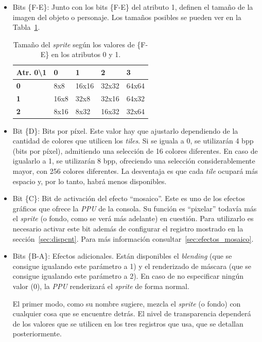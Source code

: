 \begin{itemize}
	\item Bits \{F-E\}: Junto con los bits \{F-E\} del atributo 1, definen el tamaño de la imagen del objeto o personaje. Los tamaños posibles se pueden ver en la Tabla~\ref{tab:size}.

		\begin{table}[h]
			\centering
			\begin{tabular}{| l | l | l | l | l |}
				\hline
				\textbf{Atr. 0{\textbackslash}1} & \textbf{0} & \textbf{1} & \textbf{2} & \textbf{3}  \\ \hline
				\textbf{0} & 8x8 & 16x16 & 32x32 & 64x64  \\ \hline
				\textbf{1} & 16x8 & 32x8 & 32x16 & 64x32  \\ \hline
				\textbf{2} & 8x16 & 8x32 & 16x32 & 32x64  \\ \hline
			\end{tabular}
			\caption{Tamaño del \textit{sprite} según los valores de \{F-E\} en los atributos 0 y 1.}
			\label{tab:size}
		\end{table}
		\FloatBarrier

	\item Bit \{D\}: Bits por píxel. Este valor hay que ajustarlo dependiendo de la cantidad de colores que utilicen los \textit{tiles}. Si se iguala a 0, se utilizarán 4 bpp (bits por píxel), admitiendo una selección de 16 colores diferentes. En caso de igualarlo a 1, se utilizarán 8 bpp, ofreciendo una selección considerablemente mayor, con 256 colores diferentes. La desventaja es que cada \textit{tile} ocupará más espacio y, por lo tanto, habrá menos disponibles.
	\item Bit \{C\}: Bit de activación del efecto ``mosaico''. Este es uno de los efectos gráficos que ofrece la \textit{PPU} de la consola. Su función es ``pixelar'' todavía más el \textit{sprite} (o fondo, como se verá más adelante) en cuestión. Para utilizarlo es necesario activar este bit además de configurar el registro mostrado en la sección~\ref{sec:dispcnt}. Para más información consultar~\ref{sec:efectos_mosaico}.
	\item Bits \{B-A\}: Efectos adicionales. Están disponibles el \textit{blending} (que se consigue igualando este parámetro a 1) y el renderizado de máscara (que se consigue igualando este parámetro a 2). En caso de no especificar ningún valor (0), la \textit{PPU} renderizará el \textit{sprite} de forma normal.

		El primer modo, como su nombre sugiere, mezcla el \textit{sprite} (o fondo) con cualquier cosa que se encuentre detrás. El nivel de transparencia dependerá de los valores que se utilicen en los tres registros que usa, que se detallan posteriormente.


\end{itemize}
